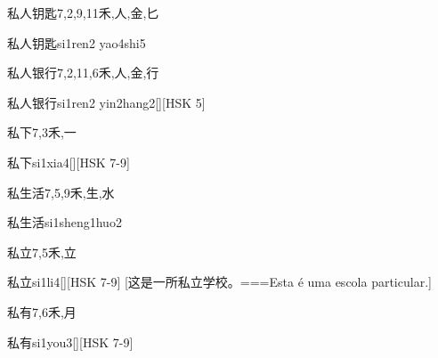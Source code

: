 \begin{Entry}{私人钥匙}{7,2,9,11}{⽲,⼈,⾦,⼔}
  \begin{Phonetics}{私人钥匙}{si1ren2 yao4shi5}
  \end{Phonetics}
\end{Entry}

\begin{Entry}{私人银行}{7,2,11,6}{⽲,⼈,⾦,⾏}
  \begin{Phonetics}{私人银行}{si1ren2 yin2hang2}[][HSK 5]
  \end{Phonetics}
\end{Entry}

\begin{Entry}{私下}{7,3}{⽲,⼀}
  \begin{Phonetics}{私下}{si1xia4}[][HSK 7-9]
  \end{Phonetics}
\end{Entry}

\begin{Entry}{私生活}{7,5,9}{⽲,⽣,⽔}
  \begin{Phonetics}{私生活}{si1sheng1huo2}
  \end{Phonetics}
\end{Entry}

\begin{Entry}{私立}{7,5}{⽲,⽴}
  \begin{Phonetics}{私立}{si1li4}[][HSK 7-9]
    [这是一所私立学校。===Esta é uma escola particular.]
  \end{Phonetics}
\end{Entry}

\begin{Entry}{私有}{7,6}{⽲,⽉}
  \begin{Phonetics}{私有}{si1you3}[][HSK 7-9]
  \end{Phonetics}
\end{Entry}

